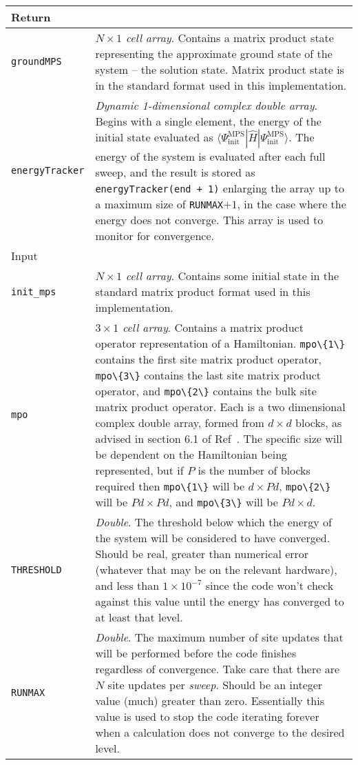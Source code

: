  \begin{longtabu}{X[1,l]X[4,l]}
 \hline
 Return & \\ \hline
 \lstinline$groundMPS$ & \emph{\(N \times 1\) cell array}. Contains a matrix product state representing the approximate ground state of the system -- the solution state. Matrix product state is in the standard format used in this implementation. \\
 \lstinline$energyTracker$ & \emph{Dynamic 1-dimensional complex double array}. Begins with a single element, the energy of the initial state evaluated as \(\langle \Psi_{\mathrm{init}}^{\mathrm{MPS}} | \hat{H} | \Psi_{\mathrm{init}}^{\mathrm{MPS}} \rangle \). The energy of the system is evaluated after each full sweep, and the result is stored as \lstinline$energyTracker(end + 1)$ enlarging the array up to a maximum size of \lstinline$RUNMAX$\(+ 1\), in the case where the energy does not converge. This array is used to monitor for convergence.\\ \hline
 Input & \\ \hline
 \lstinline$init_mps$ & \emph{\(N \times 1\) cell array}. Contains some initial state in the standard matrix product format used in this implementation. \\
 \lstinline$mpo$ & \emph{\(3 \times 1\) cell array}. Contains a matrix product operator representation of a Hamiltonian. \lstinline$mpo\{1\}$ contains the first site matrix product operator, \lstinline$mpo\{3\}$ contains the last site matrix product operator, and \lstinline$mpo\{2\}$ contains the bulk site matrix product operator. Each is a two dimensional complex double array, formed from \(d \times d\) blocks, as advised in section 6.1 of Ref~\cite{Schollwoeck11}. The specific size will be dependent on the Hamiltonian being represented, but if \(P\) is the number of blocks required then \lstinline$mpo\{1\}$ will be \(d \times Pd\), \lstinline$mpo\{2\}$ will be \(Pd \times Pd\), and \lstinline$mpo\{3\}$ will be \(Pd \times d\). \\
 \lstinline$THRESHOLD$ & \emph{Double}. The threshold below which the energy of the system will be considered to have converged. Should be real, greater than numerical error (whatever that may be on the relevant hardware), and less than \(1 \times 10^{-7}\) since the code won't check against this value until the energy has converged to at least that level.\\
 \lstinline$RUNMAX$ & \emph{Double}. The maximum number of site updates that will be performed before the code finishes regardless of convergence. Take care that there are \(N\) site updates per \emph{sweep}. Should be an integer value (much) greater than zero. Essentially this value is used to stop the code iterating forever when a calculation does not converge to the desired level.\\
 \hline
 \end{longtabu}
